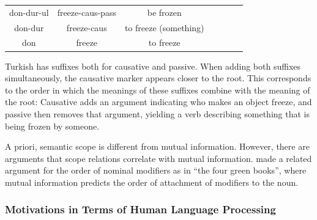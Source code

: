 \documentclass[11pt,letterpaper]{article}
\newcommand{\citet}{\Textcite}
\begin{document}
\begin{tabular}{ccccccc}
don-dur-ul & freeze-caus-pass & be frozen \\
don-dur & freeze-caus & to freeze (something) \\
don & freeze& to freeze \\
\end{tabular}

Turkish has suffixes both for causative and passive.
When adding both suffixes simultaneously, the causative marker appears closer to the root.
This corresponds to the order in which the meanings of these suffixes combine with the meaning of the root:
Causative adds an argument indicating who makes an object freeze, and passive then removes that argument, yielding a verb describing something that is being frozen by someone.

A priori, semantic scope is different from mutual information.
However, there are arguments that scope relations correlate with mutual information.
\citet{culbertson2020from} made a related argument for the order of nominal modifiers as in ``the four green books'', where mutual information predicts the order of attachment of modifiers to the noun.




\subsubsection{Motivations in Terms of Human Language Processing}
\end{document}
